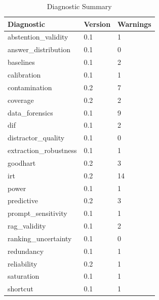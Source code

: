 \begin{table}[t]
\centering
\caption{Diagnostic Summary}
\begin{tabular}{lll}
\toprule
Diagnostic & Version & Warnings \\
\midrule
abstention\_validity & 0.1 & 1 \\
answer\_distribution & 0.1 & 0 \\
baselines & 0.1 & 2 \\
calibration & 0.1 & 1 \\
contamination & 0.2 & 7 \\
coverage & 0.2 & 2 \\
data\_forensics & 0.1 & 9 \\
dif & 0.1 & 2 \\
distractor\_quality & 0.1 & 0 \\
extraction\_robustness & 0.1 & 1 \\
goodhart & 0.2 & 3 \\
irt & 0.2 & 14 \\
power & 0.1 & 1 \\
predictive & 0.2 & 3 \\
prompt\_sensitivity & 0.1 & 1 \\
rag\_validity & 0.1 & 2 \\
ranking\_uncertainty & 0.1 & 0 \\
redundancy & 0.1 & 1 \\
reliability & 0.2 & 1 \\
saturation & 0.1 & 1 \\
shortcut & 0.1 & 1 \\
\bottomrule
\end{tabular}
\end{table}

